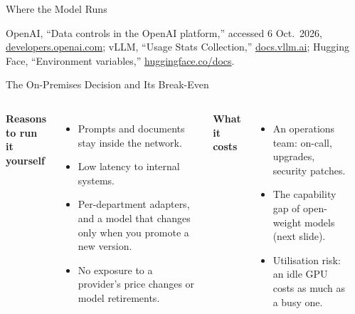 \begin{frame}{Where the Model Runs}
\begin{itemize}
  \end{itemize}
  \vspace{0.1em}
  {\scriptsize OpenAI, ``Data controls in the OpenAI platform,'' accessed 6 Oct.\ 2026, \href{https://developers.openai.com/api/docs/guides/your-data}{developers.openai.com}; vLLM, ``Usage Stats Collection,'' \href{https://docs.vllm.ai/en/latest/usage/usage_stats/}{docs.vllm.ai}; Hugging Face, ``Environment variables,'' \href{https://huggingface.co/docs/huggingface_hub/package_reference/environment_variables}{huggingface.co/docs}.\par}
\end{frame}

\begin{frame}{The On-Premises Decision and Its Break-Even}
  \begin{columns}[T,onlytextwidth]
      {\footnotesize\textbf{Reasons to run it yourself}\par}
      \begin{itemize}\scriptsize\itemsep0.1em
        \item[\textcolor{red}{$\blacktriangleright$}] Prompts and documents stay inside the network.
        \item[\textcolor{red}{$\blacktriangleright$}] Low latency to internal systems.
        \item[\textcolor{red}{$\blacktriangleright$}] Per-department adapters, and a model that changes only when you promote a new version.
        \item[\textcolor{red}{$\blacktriangleright$}] No exposure to a provider's price changes or model retirements.
      \end{itemize}
      \vspace{0.2em}
      {\footnotesize\textbf{What it costs}\par}
      \begin{itemize}\scriptsize\itemsep0.1em
        \item[\textcolor{red}{$\blacktriangleright$}] An operations team: on-call, upgrades, security patches.
        \item[\textcolor{red}{$\blacktriangleright$}] The capability gap of open-weight models (next slide).
        \item[\textcolor{red}{$\blacktriangleright$}] Utilisation risk: an idle GPU costs as much as a busy one.
      \end{itemize}
      \vspace{0.2em}
      \begin{itemize}\scriptsize

\end{itemize}
\end{columns}
\end{frame}
